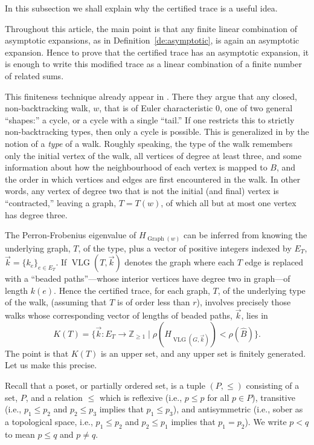 \documentclass{memo-l}
\theoremstyle{plain}
\theoremstyle{definition}
\numberwithin{section}{chapter}
\numberwithin{equation}{chapter}
\newcommand{\integers}{{\mathbb Z}}
\DeclareMathOperator{\VLG}{VLG}
\DeclareMathOperator{\Graph}{Graph}
\newcommand{\from}{\colon}
\theoremstyle{plain}
\theoremstyle{definition}
\begin{document}
{In this subsection we shall explain why the certified trace is a useful
idea.

Throughout this article, the main point is that any finite linear
combination of asymptotic expansions, as in
Definition~\ref{de:asymptotic}, is again an asymptotic expansion.
Hence to prove that the certified trace has an asymptotic expansion,
it is enough to write this modified trace as a linear combination of
a finite number of related sums.

This finiteness technique already appear in \cite{broder}.  There they
argue that any closed, non-backtracking walk, $w$, that is of Euler
characteristic $0$, one of
two general ``shapes:'' a cycle, or a cycle with a single ``tail.''
If one restricts this to strictly non-backtracking types, then only
a cycle is possible.  This is generalized in
\cite{friedman_random_graphs,friedman_relative,friedman_alon} by
the notion of a {\em type} of a walk.
Roughly speaking,
the type of the walk remembers only the initial vertex of the walk,
all vertices of degree at least three, and some information about
how the neighbourhood of each vertex is mapped to $B$, and the order
in which vertices
and edges are first encountered in the walk.
In other words, any vertex of degree two that is not the initial (and
final) vertex is ``contracted,'' leaving a graph, $T=T(w)$,
of which all but at
most one vertex has degree three.

The Perron-Frobenius eigenvalue of $H_{\Graph(w)}$ can be inferred from
knowing the underlying graph, $T$, of the type, plus a vector of
positive integers indexed by $E_T$, $\vec k=\{k_e\}_{e\in E_T}$.  If
$\VLG(T,\vec k)$ denotes the graph where each $T$ edge is replaced
with a ``\glspl{beaded path}''---whose interior vertices have degree
two in graph---of length $k(e)$.
Hence the certified trace, for each graph, $T$, of the underlying
type of the walk, (assuming that $T$ is of order less than $r$),
involves precisely those walks whose corresponding vector of lengths
of beaded paths, $\vec k$, lies in 
$$
K(T) = \{ \vec k\from E_T\to\integers_{\ge 1} \;|\;
\rho(H_{\VLG(G,\vec k)})<\rho(\widehat B) \}.
$$
The point is that $K(T)$ is an upper set, and any 
upper set is finitely generated.
Let us make this precise.

Recall that a poset, or partially ordered set, is a tuple $(P,\le)$
consisting of a set, $P$, and a relation $\le$ which is reflexive
(i.e., $p\le p$ for all $p\in P$), transitive (i.e., $p_1\le p_2$
and $p_2\le p_3$ implies that $p_1\le p_3$), and
antisymmetric (i.e., sober as a topological space,
i.e., $p_1\le p_2$ and $p_2\le p_1$ implies that
$p_1=p_2$).  We write $p<q$ to mean $p\le q$ and $p\ne q$.

}
\end{document}
